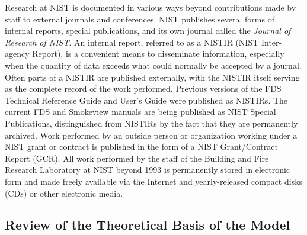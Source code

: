 \documentclass[11pt]{book}
\begin{document}
Research at NIST is documented in various ways beyond contributions made by staff to external journals and conferences.
NIST publishes several forms of internal reports, special publications, and its own journal called the {\em Journal
of Research of NIST}. An internal report, referred to as a NISTIR (NIST Inter-agency Report), is a convenient means to disseminate information,
especially when the quantity of data exceeds what could normally be accepted by a journal. Often parts of a NISTIR are
published externally, with the NISTIR itself serving as the complete record of the work performed. Previous versions of the
FDS Technical Reference Guide and User's Guide were published as NISTIRs. The current FDS and Smokeview manuals are
being published as NIST Special Publications, distinguished from NISTIRs by the fact that they are permanently archived.
Work performed by an outside person or organization working
under a NIST grant or contract is published in the form of a NIST Grant/Contract Report (GCR).
All work performed by the staff of the Building and Fire Research Laboratory at NIST beyond 1993 is permanently stored in
electronic form and made freely available via the Internet and yearly-released compact disks (CDs) or other electronic media.




\subsection{Review of the Theoretical Basis of the Model}
\end{document}

